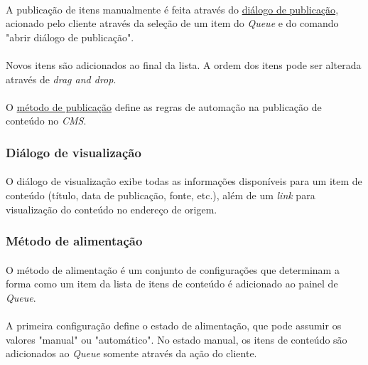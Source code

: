 \documentclass[a4paper,12pt]{article}
\def\cms{\emph{CMS}}
\def\queue{\emph{Queue}}
\def\dragndrop{\emph{drag and drop}}
\def\metodopublicacao{\hyperref[metodopublicacao]{método de publicação}}
\def\dialogopublicacao{\hyperref[dialogopublicacao]{diálogo de publicação}}
\begin{document}
\paragraph{}
A publicação de itens manualmente é feita através do \dialogopublicacao{},
acionado pelo cliente através da seleção de um item do \queue{} e do comando
"abrir diálogo de publicação".

\paragraph{}
Novos itens são adicionados ao final da lista. A ordem dos itens pode ser
alterada através de \dragndrop{}.

\paragraph{}
O \metodopublicacao{} define as regras de automação na publicação de conteúdo
no \cms{}.

\subsubsection{Diálogo de visualização} \label{dialogovisualizacao}

\paragraph{}
O diálogo de visualização exibe todas as informações disponíveis para um item
de conteúdo (título, data de publicação, fonte, etc.), além de um \emph{link}
para visualização do conteúdo no endereço de origem.

\subsubsection{Método de alimentação} \label{metodoalimentacao}

\paragraph{}
O método de alimentação é um conjunto de configurações que determinam a forma
como um item da lista de itens de conteúdo é adicionado ao painel de \queue{}.

\paragraph{}
A primeira configuração define o estado de alimentação, que pode assumir os
valores "manual" ou "automático". No estado manual, os itens de conteúdo são
adicionados ao \queue{} somente através da ação do cliente.
\end{document}
